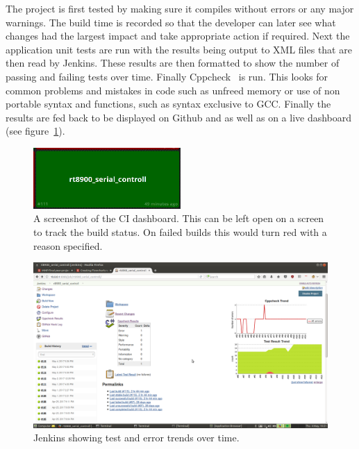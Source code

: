 The project is first tested by making sure it compiles without errors or any major warnings. The build time is recorded so that the developer can later see what changes had the largest impact and take appropriate action if required. Next the application unit tests are run with the results being output to XML files that are then read by Jenkins. These results are then formatted to show the number of passing and failing tests over time. Finally Cppcheck~\cite{Cppcheck} is run. This looks for common problems and mistakes in code such as unfreed memory or use of non portable syntax and functions, such as syntax exclusive to GCC. Finally the results are fed back to be displayed on Github and as well as on a live dashboard (see figure~\ref{fig:ci_dashboard}). 

\begin{figure}
    \centering
    \includegraphics[width=0.5\textwidth]{img/CI_dashboard.png}
    \caption{A screenshot of the CI dashboard. This can be left open on a screen to track the build status. On failed builds this would turn red with a reason specified.}
    \label{fig:ci_dashboard}
\end{figure}

\begin{figure}
    \centering
    \includegraphics[width=1\textwidth]{img/jenkins_build.png}
    \caption[Jenkins build trends]{Jenkins showing test and error trends over time.}
    \label{fig:jenkins_build}
\end{figure}

